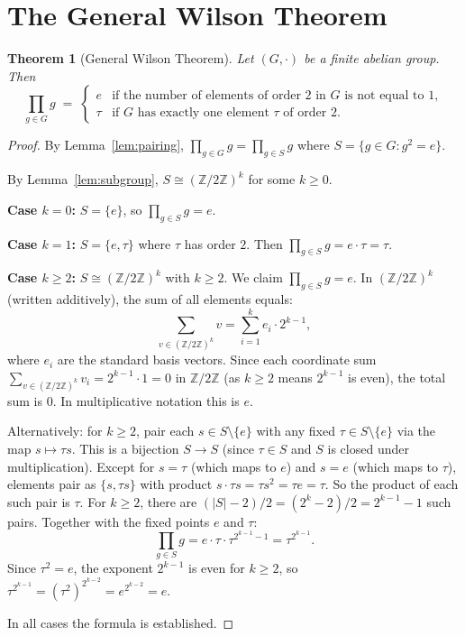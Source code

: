 \documentclass[12pt,a4paper]{amsart}
\newtheorem{theorem}{Theorem}[section]
\theoremstyle{definition}
\newcommand{\Z}{\mathbb{Z}}
\begin{document}
\section{The General Wilson Theorem}

\begin{theorem}[General Wilson Theorem]\label{thm:general_wilson}
  Let $(G, \cdot)$ be a finite abelian group.  Then
  \[
    \prod_{g \in G} g
    \;=\;
    \begin{cases}
      e   & \text{if the number of elements of order } 2 \text{ in } G
             \text{ is not equal to } 1, \\
      \tau & \text{if } G \text{ has exactly one element } \tau \text{ of order } 2.
    \end{cases}
  \]
\end{theorem}

\begin{proof}
  By Lemma~\ref{lem:pairing}, $\prod_{g \in G} g = \prod_{g \in S} g$
  where $S = \{g \in G : g^2 = e\}$.

  By Lemma~\ref{lem:subgroup}, $S \cong (\Z/2\Z)^k$ for some $k \geq 0$.

  \textbf{Case $k = 0$:} $S = \{e\}$, so $\prod_{g \in S} g = e$.

  \textbf{Case $k = 1$:} $S = \{e, \tau\}$ where $\tau$ has order $2$.
  Then $\prod_{g \in S} g = e \cdot \tau = \tau$.

  \textbf{Case $k \geq 2$:}  $S \cong (\Z/2\Z)^k$ with $k \geq 2$.
  We claim $\prod_{g \in S} g = e$.
  In $(\Z/2\Z)^k$ (written additively), the sum of all elements equals:
  \[
    \sum_{v \in (\Z/2\Z)^k} v = \sum_{i=1}^k e_i \cdot 2^{k-1},
  \]
  where $e_i$ are the standard basis vectors.  Since each coordinate sum
  $\sum_{v \in (\Z/2\Z)^k} v_i = 2^{k-1} \cdot 1 = 0$ in $\Z/2\Z$ (as $k \geq 2$
  means $2^{k-1}$ is even), the total sum is $0$.  In multiplicative notation
  this is $e$.

  Alternatively: for $k \geq 2$, pair each $s \in S \setminus \{e\}$ with any
  fixed $\tau \in S \setminus \{e\}$ via the map $s \mapsto \tau s$.
  This is a bijection $S \to S$ (since $\tau \in S$ and $S$ is closed under
  multiplication).  Except for $s = \tau$ (which maps to $e$) and $s = e$ (which
  maps to $\tau$), elements pair as $\{s, \tau s\}$ with product $s \cdot \tau s
  = \tau s^2 = \tau e = \tau$.  So the product of each such pair is $\tau$.
  For $k \geq 2$, there are $(|S| - 2)/2 = (2^k - 2)/2 = 2^{k-1} - 1$ such pairs.
  Together with the fixed points $e$ and $\tau$:
  \[
    \prod_{g \in S} g = e \cdot \tau \cdot \tau^{2^{k-1}-1} = \tau^{2^{k-1}}.
  \]
  Since $\tau^2 = e$, the exponent $2^{k-1}$ is even for $k \geq 2$, so
  $\tau^{2^{k-1}} = (\tau^2)^{2^{k-2}} = e^{2^{k-2}} = e$.

  In all cases the formula is established. \qedhere
\end{proof}
\end{document}

